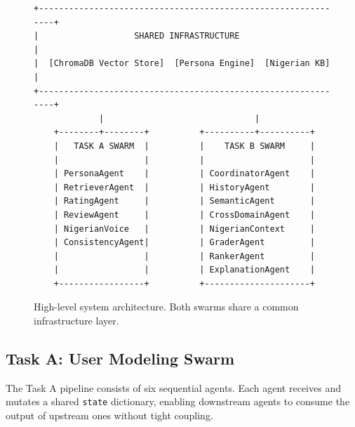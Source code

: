 \documentclass[11pt,a4paper]{article}
\begin{document}
\begin{figure}[h]
\centering
\begin{verbatim}
+--------------------------------------------------------------+
|                   SHARED INFRASTRUCTURE                       |
|  [ChromaDB Vector Store]  [Persona Engine]  [Nigerian KB]    |
+--------------------------------------------------------------+
             |                              |
    +--------+--------+          +----------+----------+
    |   TASK A SWARM  |          |    TASK B SWARM     |
    |                 |          |                     |
    | PersonaAgent    |          | CoordinatorAgent    |
    | RetrieverAgent  |          | HistoryAgent        |
    | RatingAgent     |          | SemanticAgent       |
    | ReviewAgent     |          | CrossDomainAgent    |
    | NigerianVoice   |          | NigerianContext     |
    | ConsistencyAgent|          | GraderAgent         |
    |                 |          | RankerAgent         |
    |                 |          | ExplanationAgent    |
    +-----------------+          +---------------------+
\end{verbatim}
\caption{High-level system architecture. Both swarms share a common infrastructure layer.}
\label{fig:architecture}
\end{figure}

\subsection{Task A: User Modeling Swarm}

The Task A pipeline consists of six sequential agents. Each agent receives and mutates a shared \texttt{state} dictionary, enabling downstream agents to consume the output of upstream ones without tight coupling.
\end{document}
